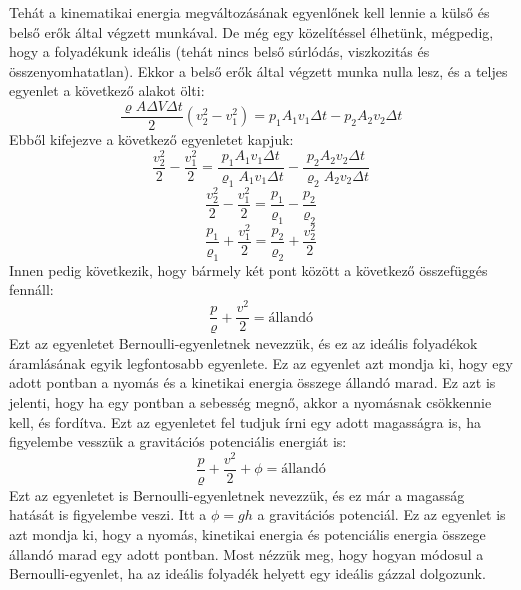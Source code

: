 \documentclass[a4paper,12pt]{article}
\begin{document}
Tehát a kinematikai energia megváltozásának egyenlőnek kell lennie a külső és belső erők által végzett munkával. De még egy közelítéssel élhetünk,
mégpedig, hogy a folyadékunk ideális (tehát nincs belső súrlódás, viszkozitás és összenyomhatatlan). Ekkor a belső erők által végzett munka nulla lesz,
és a teljes egyenlet a következő alakot ölti:
\begin{equation}
    \frac{\varrho A \Delta V \Delta t}{2} (v_2^2 - v_1^2) = p_1 A_1 v_1 \Delta t - p_2 A_2 v_2 \Delta t
\end{equation}
Ebből kifejezve a következő egyenletet kapjuk:
\begin{equation}
    \frac{v_2^2}{2} - \frac{v_1^2}{2} = \frac{p_1 A_1 v_1 \Delta t}{\varrho_1 A_1 v_1 \Delta t} - \frac{p_2 A_2 v_2 \Delta t}{\varrho_2 A_2 v_2 \Delta t}
\end{equation}
\begin{equation}
    \frac{v_2^2}{2} - \frac{v_1^2}{2} = \frac{p_1}{\varrho_1} - \frac{p_2}{\varrho_2}
\end{equation}
\begin{equation}
    \frac{p_1}{\varrho_1} + \frac{v_1^2}{2} = \frac{p_2}{\varrho_2} + \frac{v_2^2}{2}
\end{equation}
Innen pedig következik, hogy bármely két pont között a következő összefüggés fennáll:
\begin{equation}
    \frac{p}{\varrho} + \frac{v^2}{2} = \text{állandó}
\end{equation}
Ezt az egyenletet Bernoulli-egyenletnek nevezzük, és ez az ideális folyadékok áramlásának egyik legfontosabb egyenlete. Ez az egyenlet azt mondja ki, hogy egy adott pontban a nyomás
és a kinetikai energia összege állandó marad. Ez azt is jelenti, hogy ha egy pontban a sebesség megnő, akkor a nyomásnak csökkennie kell, és fordítva.
Ezt az egyenletet fel tudjuk írni egy adott magasságra is, ha figyelembe vesszük a gravitációs potenciális energiát is:
\begin{equation}
    \frac{p}{\varrho} + \frac{v^2}{2} + \phi = \text{állandó}
\end{equation}
Ezt az egyenletet is Bernoulli-egyenletnek nevezzük, és ez már a magasság hatását is figyelembe veszi. Itt a $\phi = gh$ a gravitációs potenciál.
Ez az egyenlet is azt mondja ki, hogy a nyomás, kinetikai energia és potenciális energia összege állandó marad egy adott pontban.
\newline
\newline
Most nézzük meg, hogy hogyan módosul a Bernoulli-egyenlet, ha az ideális folyadék helyett egy ideális gázzal dolgozunk.
\end{document}
